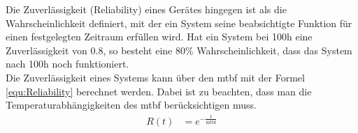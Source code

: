 Die Zuverlässigkeit (Reliability) eines Gerätes hingegen ist als die Wahrscheinlichkeit definiert, mit der ein System seine beabsichtigte Funktion für einen festgelegten Zeitraum erfüllen wird. Hat ein System bei 100h eine Zuverlässigkeit von 0.8, so besteht eine 80\% Wahrscheinlichkeit, dass das System nach 100h noch funktioniert.\cite{MTBFReliability}\\
Die Zuverlässigkeit eines Systems kann über den \ac{mtbf} mit der Formel \ref{equ:Reliability} berechnet werden. Dabei ist zu beachten, dass man die Temperaturabhängigkeiten des \ac{mtbf} berücksichtigen muss.
\begin{align}
    && R(t) &= e^{-\frac{t}{\text{mtbf}}} &&
    \label{equ:Reliability} 
\end{align}
